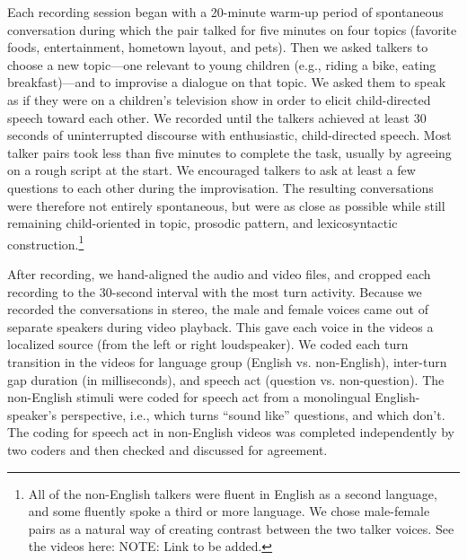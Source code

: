 \documentclass[authoryear, 12pt]{elsarticle}
\begin{document}
Each recording session began with a 20-minute warm-up period of spontaneous conversation during which the pair talked for five minutes on four topics (favorite foods, entertainment, hometown layout, and pets). Then we asked talkers to choose a new topic---one relevant to young children (e.g., riding a bike, eating breakfast)---and to improvise a dialogue on that topic. We asked them to speak as if they were on a children's television show in order to elicit child-directed speech toward each other. We recorded until the talkers achieved at least 30 seconds of uninterrupted discourse with enthusiastic, child-directed speech. Most talker pairs took less than five minutes to complete the task, usually by agreeing on a rough script at the start. We encouraged talkers to ask at least a few questions to each other during the improvisation. The resulting conversations were therefore not entirely spontaneous, but were as close as possible while still remaining child-oriented in topic, prosodic pattern, and lexicosyntactic construction.\footnote{All of the non-English talkers were fluent in English as a second language, and some fluently spoke a third or more language. We chose male-female pairs as a natural way of creating contrast between the two talker voices. See the videos here: NOTE: Link to be added.}

After recording, we hand-aligned the audio and video files, and cropped each recording to the 30-second interval with the most turn activity. Because we recorded the conversations in stereo, the male and female voices came out of separate speakers during video playback. This gave each voice in the videos a localized source (from the left or right loudspeaker). We coded each turn transition in the videos for language group (English vs. non-English), inter-turn gap duration (in milliseconds), and speech act (question vs. non-question). The non-English stimuli were coded for speech act from a monolingual English-speaker's perspective, i.e., which turns ``sound like'' questions, and which don't. The coding for speech act in non-English videos was completed independently by two coders and then checked and discussed for agreement.
\end{document}
